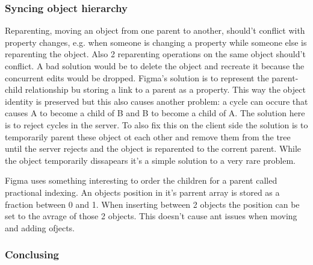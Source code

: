 \subsubsection*{Syncing object hierarchy}

Reparenting, moving an object from one parent to another, should't conflict with property changes, e.g. when someone is changing a property while someone else is reparenting the object. Also 2 reparenting operations on the same object should't conflict. A bad solution would be to delete the object and recreate it because the concurrent edits would be dropped. Figma's solution is to represent the parent-child relationship bu storing a link to a parent as a property. This way the object identity is preserved but this also causes another problem: a cycle can occure that causes A to become a child of B and B to become a child of A. The solution here is to reject cycles in the server. To also fix this on the client side the solution is to temporarily parent these object ot each other and remove them from the tree until the server rejects and the object is reparented to the corrent parent. While the object temporarily dissapears it's a simple solution to a very rare problem.

Figma uses something interesting to order the children for a parent called practional indexing. An objects position in it's parrent array is stored as a fraction between 0 and 1. When inserting between 2 objects the position can be set to the avrage of those 2 objects. This doesn't cause ant issues when moving and adding ofjects.

\subsubsection*{Conclusing}

